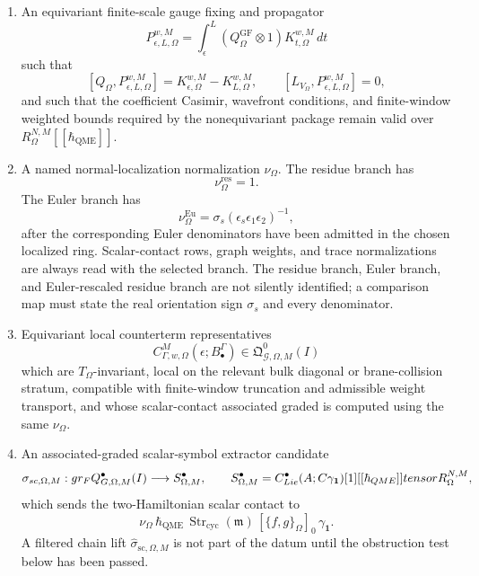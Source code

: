 \begin{defn}
\begin{enumerate}[label={(\(\Omega\arabic*\))}]
    \item An equivariant finite-scale gauge fixing and propagator
      \[
        P^{w,M}_{\epsilon,L,\Omega}
          =
        \int_\epsilon^L
          (Q^{\mathrm{GF}}_{\Omega}\otimes 1)K^{w,M}_{t,\Omega}\,dt
      \]
      such that
      \[
        [Q_\Omega,P^{w,M}_{\epsilon,L,\Omega}]
          =
        K^{w,M}_{\epsilon,\Omega}-K^{w,M}_{L,\Omega},
        \qquad
        [L_{V_\Omega},P^{w,M}_{\epsilon,L,\Omega}]=0,
      \]
      and such that the coefficient Casimir, wavefront conditions, and
      finite-window weighted bounds required by the nonequivariant package
      remain valid over \(R_\Omega^{N,M}[[\hbar_{\mathrm{QME}}]]\).

    \item A named normal-localization normalization
      \(\nu_\Omega\).  The residue branch has
      \[
        \nu_\Omega^{\mathrm{res}}=1.
      \]
      The Euler branch has
      \[
        \nu_\Omega^{\mathrm{Eu}}
          =
        \sigma_s(\epsilon_s\epsilon_1\epsilon_2)^{-1},
      \]
      after the corresponding Euler denominators have been admitted in the
      chosen localized ring.  Scalar-contact rows, graph weights, and trace
      normalizations are always read with the selected branch.  The residue
      branch, Euler branch, and Euler-rescaled residue branch are not
      silently identified; a comparison map must state the real orientation
      sign \(\sigma_s\) and every denominator.

    \item Equivariant local counterterm representatives
      \[
        C^{M}_{\Gamma,w,\Omega}(\epsilon;B^\Gamma_\bullet)
        \in
        \mathfrak Q^0_{\mathcal G,\Omega,M}(I)
      \]
      which are \(T_\Omega\)-invariant, local on the relevant bulk
      diagonal or brane-collision stratum, compatible with
      finite-window truncation and admissible weight transport, and
      whose scalar-contact associated graded is computed using the same
      \(\nu_\Omega\).

    \item An associated-graded scalar-symbol extractor candidate
      \[
        \sigma_{sc,\Omega,M}:
        gr_{F}
        Q^\bullet_{G,\Omega,M}(I)
        \longrightarrow
        S^\bullet_{\Omega,M},
        \qquad
        S^\bullet_{\Omega,M}
          =
        C^\bullet_{Lie}
          (A;C\gamma_{\mathbf 1})[1]
          [[\hbar_{QME}]]
          tensor R_\Omega^{N,M},
      \]
      which sends the two-Hamiltonian scalar contact to
      \[
        \nu_\Omega\,
        \hbar_{\mathrm{QME}}\,
        \operatorname{Str}_{\mathrm{cyc}}(\mathfrak m)\,
        [\{f,g\}_\Omega]_0\,\gamma_{\mathbf 1}.
        \label{eq:app-omega-scalar-contact-symbol}
      \]
      A filtered chain lift
      \(\widehat\sigma_{\mathrm{sc},\Omega,M}\) is not part of the datum
      until the obstruction test below has been passed.


\end{enumerate}
\end{defn}
